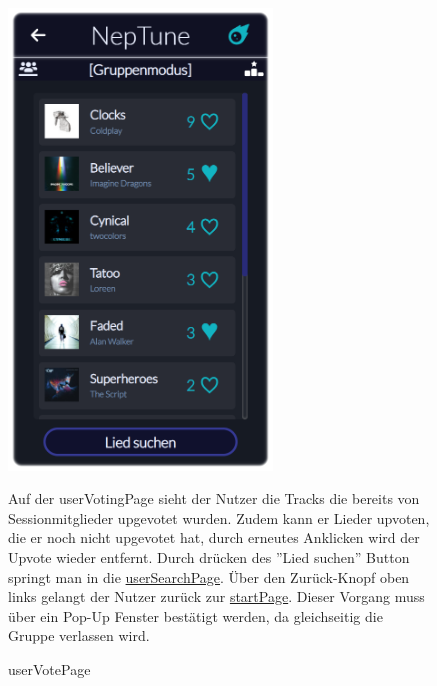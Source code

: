 \documentclass[oneside, ngerman]{sdqtechreport}
\begin{document}
\begin{figure}
    \hypertarget{userVotePage}{}
    \begin{minipage}[t]{7 cm}
        \vspace{-1.5ex}
        \includegraphics[width=7cm]{LATEX/Pflichtenheft/GraphicDesigns/userVotePage.png}
        \caption{userVotePage}
    \end{minipage}
    \hspace{1cm}
    \begin{minipage}[t]{7 cm}
        \vspace{1cm}
        Auf der userVotingPage sieht der Nutzer die Tracks die bereits von Sessionmitglieder upgevotet wurden. Zudem kann er Lieder upvoten, die er noch nicht upgevotet hat, durch erneutes Anklicken wird der Upvote wieder entfernt. Durch drücken des ''Lied suchen'' Button springt man in die  \hyperlink{userSearchPage}{userSearchPage}. Über den Zurück-Knopf oben links gelangt der Nutzer zurück zur \hyperlink{startPage}{startPage}. Dieser Vorgang muss über ein Pop-Up Fenster bestätigt werden, da gleichseitig die Gruppe verlassen wird.
    \end{minipage}
\end{figure}
\end{document}
